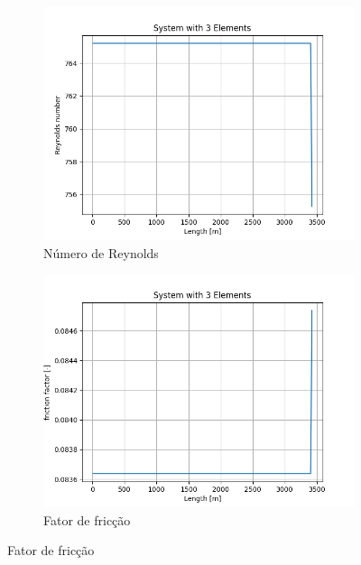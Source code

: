 \documentclass[final,3p]{elsarticle}
\numberwithin{equation}{section}
\begin{document}
\begin{figure}
          \begin{subfigure}{0.45\textwidth}
            \includegraphics[width=\textwidth]{flow/system1_Re.png}
            \caption{Número de Reynolds}
          \end{subfigure}
          \hfill
          \begin{subfigure}{0.45\textwidth}
            \includegraphics[width=\textwidth]{flow/system1_f.png}
            \caption{Fator de fricção}
          \end{subfigure}


\end{figure}
\end{document}
